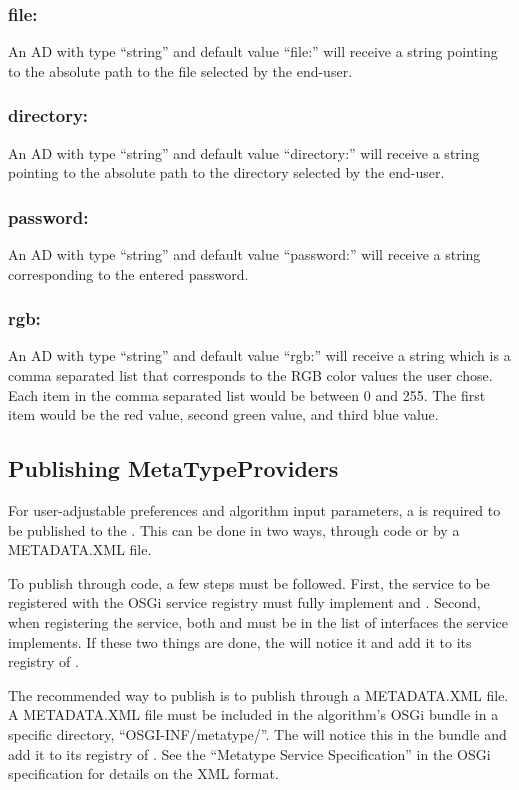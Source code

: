 \subsubsection*{file:}
An AD with type ``string'' and default value ``file:'' will receive a string
pointing to the absolute path to the file selected by the end-user.

\subsubsection*{directory:}
An AD with type ``string'' and default value ``directory:'' will receive a string
pointing to the absolute path to the directory selected by the end-user.

\subsubsection*{password:}
An AD with type ``string'' and default value ``password:'' will receive a string
corresponding to the entered password.

\subsubsection*{rgb:} 
An AD with type ``string'' and default value ``rgb:'' will
receive a string which is a comma separated list that corresponds to the RGB
color values the user chose. Each item in the comma separated list would be
between 0 and 255. The first item would be the red value, second green value,
and third blue value.

\subsection{Publishing MetaTypeProviders}

For user-adjustable preferences and algorithm input parameters, a
 is required to be published to the
. This can be done in two ways, through code or by a
METADATA.XML file.

To publish through code, a few steps must be followed. First, the service to be
registered with the OSGi service registry must fully implement
 and
. Second, when
registering the service, both  and 
must be in the list of interfaces the service implements. If these two things are
done, the  will notice it and add it to its registry of
.

The recommended way to publish  is to publish through a
METADATA.XML file. A METADATA.XML file must be included in the algorithm's OSGi
bundle in a specific directory, ``OSGI-INF/metatype/''. The
 will notice this in the bundle and add it to its registry
of . See the ``Metatype Service Specification'' in the
OSGi specification for details on the XML format.
